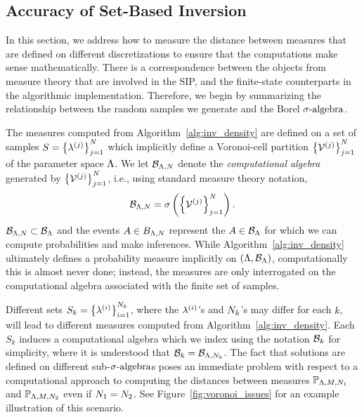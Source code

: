\subsection{Accuracy of Set-Based Inversion}\label{sec:ch03-set}


In this section, we address how to measure the distance between measures that are defined on different discretizations to ensure that the computations make sense mathematically.
There is a correspondence between the objects from measure theory that are involved in the SIP, and the finite-state counterparts in the algorithmic implementation.
Therefore, we begin by summarizing the relationship between the random samples we generate and the Borel $\sigma\text{-algebra}$.

The measures computed from Algorithm~\ref{alg:inv_density} are defined on a set of samples $S = \left\{\lambda^{(j)}\right\}_{j=1}^{N}$ which implicitly define a Voronoi-cell partition $\left\{\mathcal{V}^{(j)}\right\}_{j=1}^{N}$ of the parameter space ${\Lambda}$.
We let $\mathcal{B}_{{\Lambda}, N}$ denote the \emph{computational algebra} generated by $\left\{\mathcal{V}^{(j)}\right\}_{j=1}^{N}$, i.e., using standard measure theory notation,
$$
	\mathcal{B}_{{\Lambda},N} = \sigma\left(\left\{\mathcal{V}^{(j)}\right\}_{j=1}^{N}\right).
$$
$\mathcal{B}_{{\Lambda}, N}\subset \mathcal{B}_{\Lambda}$ and the events $A\in B_{{\Lambda}, N}$ represent the $A\in\mathcal{B}_{\Lambda}$ for which we can compute probabilities and make inferences.
While Algorithm~\ref{alg:inv_density} ultimately defines a probability measure implicitly on $({\Lambda},\mathcal{B}_{\Lambda})$, computationally this is almost never done; instead, the measures are only interrogated on the computational algebra associated with the finite set of samples.

Different sets $S_k = \left\{\lambda^{(i)}\right\}_{i=1}^{N_k}$, where the $\lambda^{(i)}$'s and $N_k$'s may differ for each $k$, will lead to different measures computed from Algorithm~\ref{alg:inv_density}.
Each $S_k$ induces a computational algebra which we index using the notation $\mathcal{B}_{k}$ for simplicity, where it is understood that $\mathcal{B}_k = \mathcal{B}_{{\Lambda}, N_k}$.
The fact that solutions are defined on different sub-$\sigma\text{-algebra}$s poses an immediate problem with respect to a computational approach to computing the distances between measures $\mathbb{P}_{{\Lambda}, M, N_1}$ and $\mathbb{P}_{{\Lambda}, M, N_2}$ even if $N_1=N_2$.
See Figure~\ref{fig:voronoi_issues} for an example illustration of this scenario.

